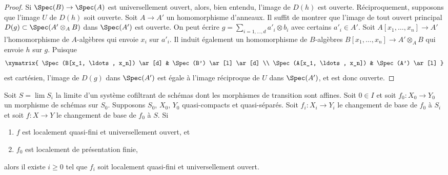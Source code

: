 \begin{proof}
Si $\Spec(B) \to \Spec(A)$ est universellement ouvert, alors, bien entendu,
l'image de $D(h)$ est ouverte. Réciproquement, supposons que l'image $U$ de
$D(h)$ soit ouverte. Soit $A \to A'$ un homomorphisme d'anneaux. Il suffit de montrer
que l'image de tout ouvert principal $D(g) \subset \Spec(A' \otimes_A B)$
dans $\Spec(A')$ est ouverte. On peut écrire
$g = \sum_{i = 1, \ldots, d} a'_i \otimes b_i$ avec certains $a'_i \in A'$.
Soit $A[x_1, \ldots, x_n] \to A'$ l'homomorphisme de $A$-algèbres
qui envoie $x_i$ sur $a'_i$. Il induit également un homomorphisme de $B$-algèbres
$B[x_1, \ldots, x_n] \to A' \otimes_A B$ qui envoie $h$ sur $g$.
Puisque
$$
\xymatrix{
\Spec(B[x_1, \ldots, x_n]) \ar[d] &
\Spec(B') \ar[l] \ar[d] \\
\Spec(A[x_1, \ldots, x_n]) &
\Spec(A') \ar[l]
}
$$
est cartésien, l'image de $D(g)$ dans $\Spec(A')$ est égale à
l'image réciproque de $U$ dans $\Spec(A')$, et est donc ouverte.
\end{proof}

\begin{lemma}
\label{lemma-descend-quasi-finite-universally-open}
Soit $S = \lim S_i$ la limite d'un système cofiltrant de schémas
dont les morphismes de transition sont affines.
Soit $0 \in I$ et soit $f_0 : X_0 \to Y_0$ un morphisme de schémas sur $S_0$.
Supposons $S_0$, $X_0$, $Y_0$ quasi-compacts et quasi-séparés.
Soit $f_i : X_i \to Y_i$ le changement de base de $f_0$ à $S_i$ et
soit $f : X \to Y$ le changement de base de $f_0$ à $S$.
Si
\begin{enumerate}
\item $f$ est localement quasi-fini et universellement ouvert, et
\item $f_0$ est localement de présentation finie,
\end{enumerate}
alors il existe $i \geq 0$ tel que $f_i$ soit localement quasi-fini
et universellement ouvert.
\end{lemma}

